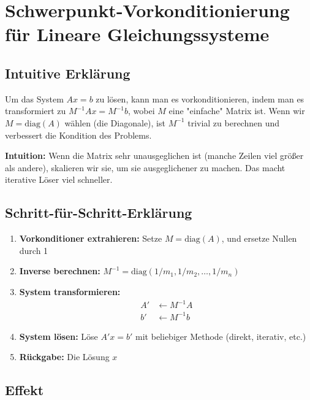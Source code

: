 \documentclass[a4paper,12pt]{article}
\begin{document}
\section{Schwerpunkt-Vorkonditionierung für Lineare Gleichungssysteme}

\subsection{Intuitive Erklärung}

Um das System $Ax = b$ zu lösen, kann man es vorkonditionieren, indem man es transformiert zu $M^{-1} A x = M^{-1} b$, wobei $M$ eine "einfache" Matrix ist. Wenn wir $M = \text{diag}(A)$ wählen (die Diagonale), ist $M^{-1}$ trivial zu berechnen und verbessert die Kondition des Problems.

\textbf{Intuition:} Wenn die Matrix sehr unausgeglichen ist (manche Zeilen viel größer als andere), skalieren wir sie, um sie ausgeglichener zu machen. Das macht iterative Löser viel schneller.

\subsection{Schritt-für-Schritt-Erklärung}

\begin{enumerate}
\item \textbf{Vorkonditioner extrahieren:} Setze $M = \text{diag}(A)$, und ersetze Nullen durch 1

\item \textbf{Inverse berechnen:} $M^{-1} = \text{diag}(1/m_1, 1/m_2, \ldots, 1/m_n)$

\item \textbf{System transformieren:} 
\begin{align}
A' &\leftarrow M^{-1} A \\
b' &\leftarrow M^{-1} b
\end{align}

\item \textbf{System lösen:} Löse $A' x = b'$ mit beliebiger Methode (direkt, iterativ, etc.)

\item \textbf{Rückgabe:} Die Lösung $x$
\end{enumerate}

\subsection{Effekt}
\end{document}

